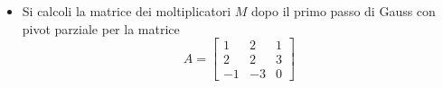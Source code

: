 \begin{itemize}
\item Si calcoli la matrice dei moltiplicatori $M$ dopo il primo passo
di Gauss con pivot parziale per la matrice
\bigskip
\[
A=\left[
\begin{array}{ccc}
1 & 2 & 1 \\
2 & 2 & 3\\
-1 & -3 & 0
\end{array}\right]
\]
\end{itemize}
